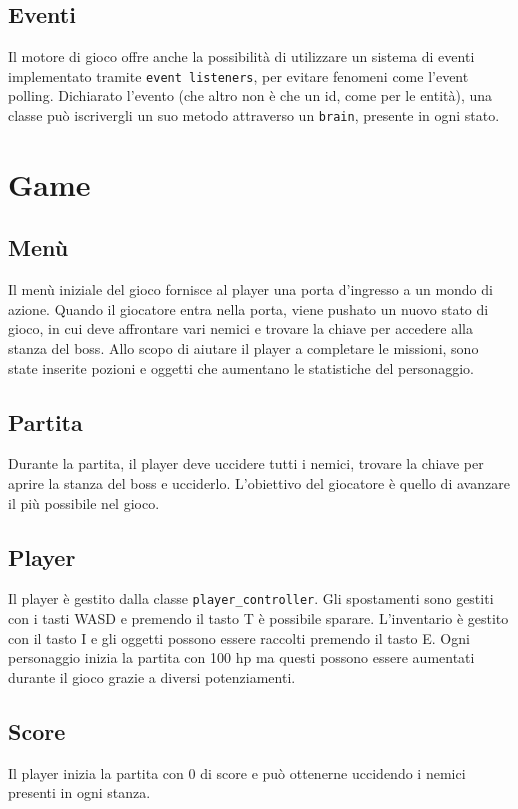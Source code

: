 \documentclass{article}
\begin{document}
\subsection{Eventi}

Il motore di gioco offre anche la possibilità di utilizzare un sistema di eventi implementato tramite \verb|event listeners|, per evitare fenomeni come l'event polling. Dichiarato l'evento (che altro non è che un id, come per le entità), una classe può iscrivergli un suo metodo attraverso un \verb|brain|, presente in ogni stato.

\section{Game}

\subsection{Menù}
Il menù iniziale del gioco fornisce al player una porta d'ingresso a un mondo di azione. Quando il giocatore entra nella porta, viene pushato un nuovo stato di gioco, in cui deve affrontare vari nemici e trovare la chiave per accedere alla stanza del boss. Allo scopo di aiutare il player a completare le missioni, sono state inserite pozioni e oggetti che aumentano le statistiche del personaggio.

\subsection{Partita}
Durante la partita, il player deve uccidere tutti i nemici, trovare la chiave per aprire la stanza del boss e ucciderlo. 
L'obiettivo del giocatore è quello di avanzare il più possibile nel gioco.

\subsection{Player}
Il player è gestito dalla classe \verb|player_controller|. Gli spostamenti sono gestiti con i tasti WASD e premendo il tasto T è possibile sparare. L'inventario è gestito con il tasto I e gli oggetti possono essere raccolti premendo il tasto E. Ogni personaggio inizia la partita con 100 hp ma questi possono essere aumentati durante il gioco grazie a diversi potenziamenti.

 \subsection{Score}
 Il player inizia la partita con 0 di score e può ottenerne uccidendo i nemici presenti in ogni stanza.
\end{document}
